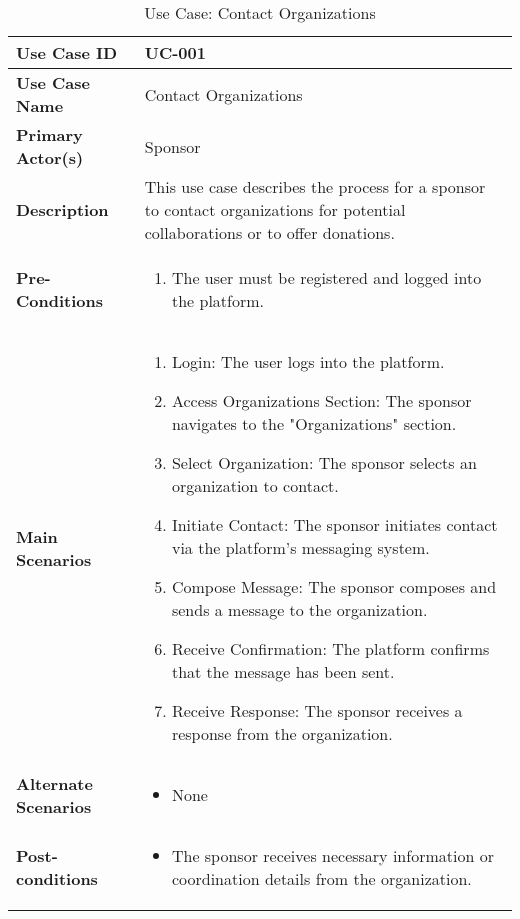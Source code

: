\begin{table}[!ht]
    \centering
    \renewcommand{\arraystretch}{1.3} %
    \begin{tabularx}{\textwidth}{|l|X|}
        \hline
        \textbf{Use Case ID} & UC-001 \\
        \hline
        \textbf{Use Case Name} & Contact Organizations \\
        \hline
        \textbf{Primary Actor(s)} & Sponsor \\
        \hline
        \textbf{Description} &  This use case describes the process for a sponsor to contact organizations for potential collaborations or to offer donations.\\
        \hline
        \textbf{Pre-Conditions} & 
        \begin{enumerate}[label=\arabic*.,itemsep=0pt]
            \item The user must be registered and logged into the platform.
        \end{enumerate} \\
        \hline
        \textbf{Main Scenarios} & 
        \begin{enumerate}[label=\arabic*.,itemsep=0pt]
            \item Login: The user logs into the platform.
            \item Access Organizations Section: The sponsor navigates to the "Organizations" section.
            \item Select Organization: The sponsor selects an organization to contact.
            \item Initiate Contact: The sponsor initiates contact via the platform's messaging system.
            \item Compose Message: The sponsor composes and sends a message to the organization.
            \item Receive Confirmation: The platform confirms that the message has been sent.
            \item Receive Response: The sponsor receives a response from the organization.
        \end{enumerate} \\
        
        \hline
        \textbf{Alternate Scenarios} & 
        \begin{itemize}[label=--,itemsep=0pt]
            \item None
        \end{itemize} \\
        \hline
        \textbf{Post-conditions} & 
        \begin{itemize}[label=--,itemsep=0pt]
            \item The sponsor receives necessary information or coordination details from the organization.
        \end{itemize} \\
        \hline
    \end{tabularx}
    \caption{Use Case: Contact Organizations}
    \label{tab:use-case-register}
\end{table}

